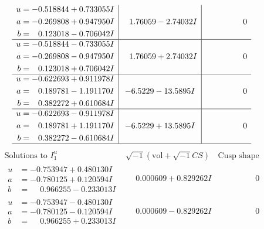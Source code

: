 \documentclass[1p]{elsarticle_modified}
\theoremstyle{definition}
\newcommand{\I}{\sqrt{-1}}
\begin{document}
$$\begin{array}{c|c|c}
\begin{aligned}
u &= -0.518844 + 0.733055 I \\
a &= -0.269808 + 0.947950 I \\
b &= \phantom{-}0.123018 - 0.706042 I\end{aligned}
 & \phantom{-}1.76059 - 2.74032 I & \phantom{-0.000000 } 0 \\ \hline\begin{aligned}
u &= -0.518844 - 0.733055 I \\
a &= -0.269808 - 0.947950 I \\
b &= \phantom{-}0.123018 + 0.706042 I\end{aligned}
 & \phantom{-}1.76059 + 2.74032 I & \phantom{-0.000000 } 0 \\ \hline\begin{aligned}
u &= -0.622693 + 0.911978 I \\
a &= \phantom{-}0.189781 - 1.191170 I \\
b &= \phantom{-}0.382272 + 0.610684 I\end{aligned}
 & -6.5229 - 13.5895 I & \phantom{-0.000000 } 0 \\ \hline\begin{aligned}
u &= -0.622693 - 0.911978 I \\
a &= \phantom{-}0.189781 + 1.191170 I \\
b &= \phantom{-}0.382272 - 0.610684 I\end{aligned}
 & -6.5229 + 13.5895 I & \phantom{-0.000000 } 0\\
 \hline 
 \end{array}$$\newpage$$\begin{array}{c|c|c}  
\text{Solutions to }I^u_{1}& \I (\text{vol} + \sqrt{-1}CS) & \text{Cusp shape}\\
 \hline 
\begin{aligned}
u &= -0.753947 + 0.480130 I \\
a &= -0.780125 + 0.120594 I \\
b &= \phantom{-}0.966255 - 0.233013 I\end{aligned}
 & \phantom{-}0.000609 + 0.829262 I & \phantom{-0.000000 } 0 \\ \hline\begin{aligned}
u &= -0.753947 - 0.480130 I \\
a &= -0.780125 - 0.120594 I \\
b &= \phantom{-}0.966255 + 0.233013 I\end{aligned}
 & \phantom{-}0.000609 - 0.829262 I & \phantom{-0.000000 } 0 \\ \hline\begin{aligned}

\end{aligned}
\end{array}$$
\end{document}
